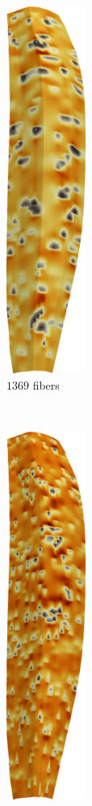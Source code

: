 \begin{figure}
  \centering%
  \begin{subfigure}[t]{0.19\textwidth}%
    \centering%
    \includegraphics[height=12cm]{images/results/application/emg37.png}%
    \caption{$1369$ fibers}%
    \label{fig:emg37}%
  \end{subfigure} \,
  \begin{subfigure}[t]{0.19\textwidth}%
    \centering%
    \includegraphics[height=12cm]{images/results/application/emg67.png}%

\end{subfigure}
\end{figure}
